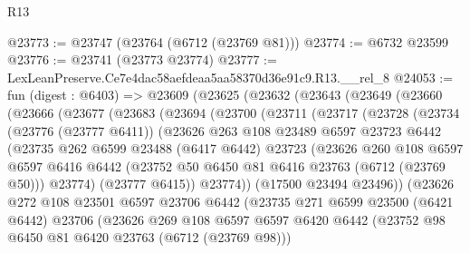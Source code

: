 \begin{lexlean}{R13}
\begin{coremodule}
@23773 := @23747 (@23764 (@6712 (@23769 @81)))
@23774 := @6732 @23599
@23776 := @23741 (@23773 @23774)
@23777 := LexLeanPreserve.Ce7e4dac58aefdeaa5aa58370d36e91c9.R13.__rel_8
@24053 := fun (digest : @6403) =>
  @23609
    (@23625
      (@23632
        (@23643
          (@23649
            (@23660
              (@23666
                (@23677
                  (@23683
                    (@23694
                      (@23700
                        (@23711
                          (@23717
                            (@23728
                              (@23734
                                (@23776 (@23777 @6411))
                                (@23626
                                  @263
                                  @108
                                  @23489
                                  @6597
                                  @23723
                                  @6442
                                  (@23735
                                    @262
                                    @6599
                                    @23488
                                    (@6417 @6442)
                                    @23723
                                    (@23626
                                      @260
                                      @108
                                      @6597
                                      @6597
                                      @6416
                                      @6442
                                      (@23752 @50 @6450 @81 @6416 @23763 (@6712 (@23769 @50)))
                                      @23774)
                                    (@23777 @6415))
                                  @23774))
                              (@17500 @23494 @23496))
                            (@23626
                              @272
                              @108
                              @23501
                              @6597
                              @23706
                              @6442
                              (@23735
                                @271
                                @6599
                                @23500
                                (@6421 @6442)
                                @23706
                                (@23626
                                  @269
                                  @108
                                  @6597
                                  @6597
                                  @6420
                                  @6442
                                  (@23752 @98 @6450 @81 @6420 @23763 (@6712 (@23769 @98)))

\end{coremodule}
\end{lexlean}
